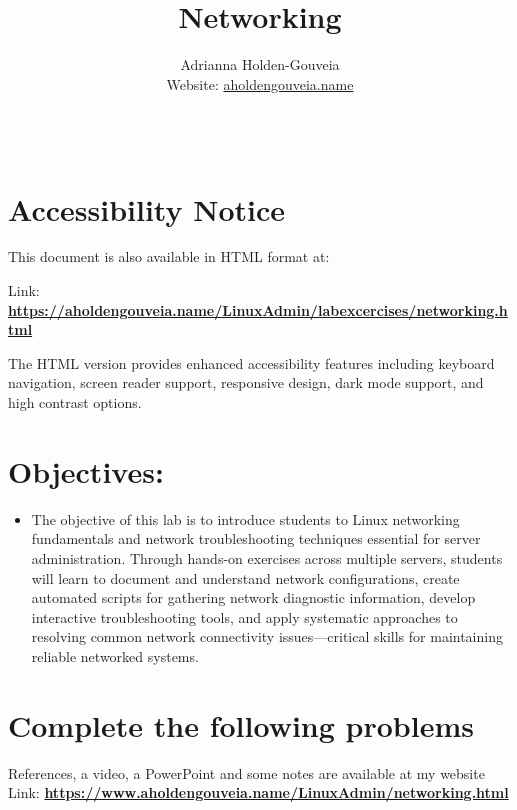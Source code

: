 \documentclass[12pt]{article}
\title{Networking}
\author{
        Adrianna Holden-Gouveia \\
        Website: \href{https://aholdengouveia.name}{aholdengouveia.name}\\ 
        \date{\vspace{-5ex}}
        \faGithub {: aholdengouveia} \\
        }
\begin{document}
    

\maketitle



\section*{Accessibility Notice}
This document is also available in HTML format at:

Link: \href{https://aholdengouveia.name/LinuxAdmin/labexcercises/networking.html}{\textbf{https://aholdengouveia.name/LinuxAdmin/labexcercises/networking.html}}

The HTML version provides enhanced accessibility features including keyboard navigation, screen reader support, responsive design, dark mode support, and high contrast options.

\section*{Objectives:}
\begin{itemize}
    \item The objective of this lab is to introduce students to Linux networking fundamentals and network troubleshooting techniques essential for server administration. Through hands-on exercises across multiple servers, students will learn to document and understand network configurations, create automated scripts for gathering network diagnostic information, develop interactive troubleshooting tools, and apply systematic approaches to resolving common network connectivity issues—critical skills for maintaining reliable networked systems.
\end{itemize}
\section*{Complete the following problems}

References, a video, a PowerPoint and some notes are available at my website
Link: \href{https://www.aholdengouveia.name/LinuxAdmin/networking.html}{\textbf{https://www.aholdengouveia.name/LinuxAdmin/networking.html}}
\end{document}

